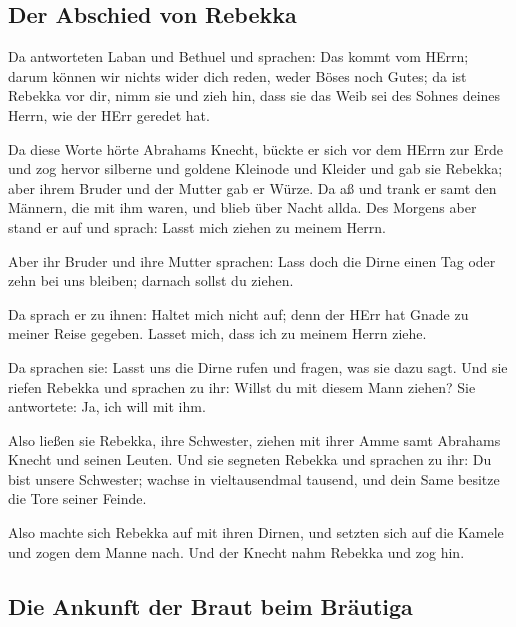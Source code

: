 \hypertarget{der-abschied-von-rebekka}{%
\subsection{Der Abschied von Rebekka}\label{der-abschied-von-rebekka}}

 Da antworteten Laban und Bethuel und sprachen: Das kommt
vom HErrn; darum können wir nichts wider dich reden, weder Böses noch
Gutes;  da ist Rebekka vor dir, nimm sie und zieh hin,
dass sie das Weib sei des Sohnes deines Herrn, wie der HErr geredet hat.

 Da diese Worte hörte Abrahams Knecht, bückte er sich vor
dem HErrn zur Erde  und zog hervor silberne und goldene
Kleinode und Kleider und gab sie Rebekka; aber ihrem Bruder und der
Mutter gab er Würze.  Da aß und trank er samt den
Männern, die mit ihm waren, und blieb über Nacht allda. Des Morgens aber
stand er auf und sprach: Lasst mich ziehen zu meinem Herrn.

 Aber ihr Bruder und ihre Mutter sprachen: Lass doch die
Dirne einen Tag oder zehn bei uns bleiben; darnach sollst du ziehen.

 Da sprach er zu ihnen: Haltet mich nicht auf; denn der
HErr hat Gnade zu meiner Reise gegeben. Lasset mich, dass ich zu meinem
Herrn ziehe.

 Da sprachen sie: Lasst uns die Dirne rufen und fragen,
was sie dazu sagt.  Und sie riefen Rebekka und sprachen
zu ihr: Willst du mit diesem Mann ziehen? Sie antwortete: Ja, ich will
mit ihm.

 Also ließen sie Rebekka, ihre Schwester, ziehen mit
ihrer Amme samt Abrahams Knecht und seinen Leuten.  Und
sie segneten Rebekka und sprachen zu ihr: Du bist unsere Schwester;
wachse in vieltausendmal tausend, und dein Same besitze die Tore seiner
Feinde.

 Also machte sich Rebekka auf mit ihren Dirnen, und
setzten sich auf die Kamele und zogen dem Manne nach. Und der Knecht
nahm Rebekka und zog hin.

\hypertarget{die-ankunft-der-braut-beim-bruxe4utiga}{%
\subsection{Die Ankunft der Braut beim
Bräutiga}\label{die-ankunft-der-braut-beim-bruxe4utiga}}

